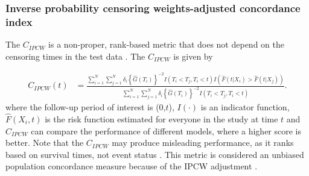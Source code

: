 \documentclass[APA,LATO1COL]{WileyNJD-v2}
\begin{document}
\hypertarget{inverse-probability-censoring-weights-adjusted-concordance-index}{%
\subsubsection{Inverse probability censoring weights-adjusted
concordance
index}\label{inverse-probability-censoring-weights-adjusted-concordance-index}}

The \(C_{IPCW}\) is a non-proper, rank-based metric that does not depend
on the censoring times in the test data \citep{uno2011}. The
\(C_{IPCW}\) is given by

\begin{align} \label{eq:cidx}
C_{IPCW}(t) &= \frac{\sum^{N}_{i=1}\sum^{N}_{j=1}\delta_{i}\left\{\widehat{G}(T_{i})\right\}^{-2} I(T_{i}<T_{j},T_{i}<t) I\left(\widehat{F}(t|X_{i})>\widehat{F}(t|X_{j})\right)}{\sum^{N}_{i=1}\sum^{N}_{j=1}\delta_{i}\left\{\widehat{G}(T_{i})\right\}^{-2} I(T_{i}<T_{j},T_{i}<t)}.
\end{align} where the follow-up period of interest is (0,\(t\)),
\(I(\cdot)\) is an indicator function, \(\widehat{F}(X_{i},t)\) is the
risk function estimated for everyone in the study at time \(t\) and
\(C_{IPCW}\) can compare the performance of different models, where a
higher score is better. Note that the \(C_{IPCW}\) may produce
misleading performance, as it ranks based on survival times, not event
status \citep{cindexfails2019}. This metric is considered an unbiased
population concordance measure because of the IPCW adjustment
\citep{uno2011}.
\end{document}

